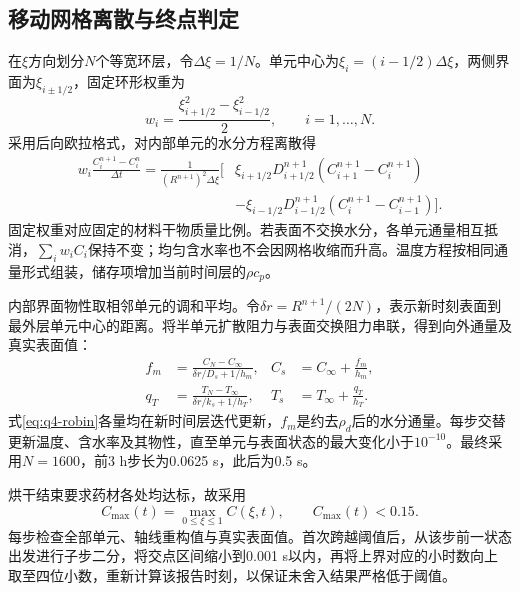 \subsection{移动网格离散与终点判定}

在$\xi$方向划分$N$个等宽环层，令$\Delta\xi=1/N$。单元中心为$\xi_i=(i-1/2)\Delta\xi$，两侧界面为$\xi_{i\pm1/2}$，固定环形权重为
\begin{equation}
 w_i=\frac{\xi_{i+1/2}^2-\xi_{i-1/2}^2}{2},\qquad i=1,\ldots,N.
 \label{eq:q4-weights}
\end{equation}
采用后向欧拉格式，对内部单元的水分方程离散得
\begin{equation}
 \begin{aligned}
 w_i\frac{C_i^{n+1}-C_i^n}{\Delta t}
 =\frac{1}{(R^{n+1})^2\Delta\xi}\bigl[&
 \xi_{i+1/2}D_{i+1/2}^{n+1}(C_{i+1}^{n+1}-C_i^{n+1})\\
 &-\xi_{i-1/2}D_{i-1/2}^{n+1}(C_i^{n+1}-C_{i-1}^{n+1})\bigr].
 \end{aligned}
 \label{eq:q4-fvm}
\end{equation}
固定权重对应固定的材料干物质量比例。若表面不交换水分，各单元通量相互抵消，$\sum_iw_iC_i$保持不变；均匀含水率也不会因网格收缩而升高。温度方程按相同通量形式组装，储存项增加当前时间层的$\rho c_p$。

内部界面物性取相邻单元的调和平均。令$\delta r=R^{n+1}/(2N)$，表示新时刻表面到最外层单元中心的距离。将半单元扩散阻力与表面交换阻力串联，得到向外通量及真实表面值：
\begin{equation}
 \begin{aligned}
 f_m&=\frac{C_N-C_\infty}{\delta r/D_s+1/h_m},&
 C_s&=C_\infty+\frac{f_m}{h_m},\\
 q_T&=\frac{T_N-T_\infty}{\delta r/k_s+1/h_T},&
 T_s&=T_\infty+\frac{q_T}{h_T}.
 \end{aligned}
 \label{eq:q4-robin}
\end{equation}
式\eqref{eq:q4-robin}各量均在新时间层迭代更新，$f_m$是约去$\rho_d$后的水分通量。每步交替更新温度、含水率及其物性，直至单元与表面状态的最大变化小于$10^{-10}$。最终采用$N=1600$，前3 h步长为0.0625 s，此后为0.5 s。

烘干结束要求药材各处均达标，故采用
\begin{equation}
 C_{\max}(t)=\max_{0\leq\xi\leq1}C(\xi,t),\qquad C_{\max}(t)<0.15.
 \label{eq:q4-stop}
\end{equation}
每步检查全部单元、轴线重构值与真实表面值。首次跨越阈值后，从该步前一状态出发进行子步二分，将交点区间缩小到0.001 s以内，再将上界对应的小时数向上取至四位小数，重新计算该报告时刻，以保证未舍入结果严格低于阈值。

